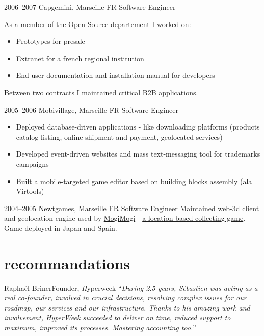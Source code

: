 \documentclass[]{friggeri}
\begin{document}
\begin{entrylist}
  \entry
    {2006–2007}
    {Capgemini, Marseille FR}
    {Software Engineer}
    {As a member of the Open Source departement I worked on:
    \begin{itemize}
    \item Prototypes for presale
    \item Extranet for a french regional institution
    \item End user documentation and installation manual for developers
    \end{itemize}
    Between two contracts I maintained critical B2B applications.}
  \entry
    {2005–2006}
    {Mobivillage, Marseille FR}
    {Software Engineer}
    {\begin{itemize}
    \item Deployed database-driven applications - like downloading platforms (products catalog listing, online shipment and payment, geolocated services)
    \item Developed event-driven websites and mass text-messaging tool for trademarks campaigns
    \item Built a mobile-targeted game editor based on building blocks assembly (ala Virtools)
    \end{itemize}}
  \entry
    {2004–2005}
    {Newtgames, Marseille FR}
    {Software Engineer}
    {Maintained web-3d client and geolocation engine used by \href{http://mogimogi.com}{MogiMogi} - \href{http://thefeaturearchives.com/100501.html}{a location-based collecting game}. Game deployed in Japan and Spain.}
\end{entrylist}

\section{recommandations}

\begin{quoting}{Raphaël Briner}{Founder, {\emph Hyperweek}}
``\textit{During 2.5 years, Sébastien was acting as a real co-founder, involved in crucial decisions, resolving complex issues for our roadmap, our services and our infrastructure. Thanks to his amazing work and involvement, HyperWeek succeeded to deliver on time, reduced support to maximum, improved its processes. Mastering accounting too.}''
\end{quoting}
\end{document}
